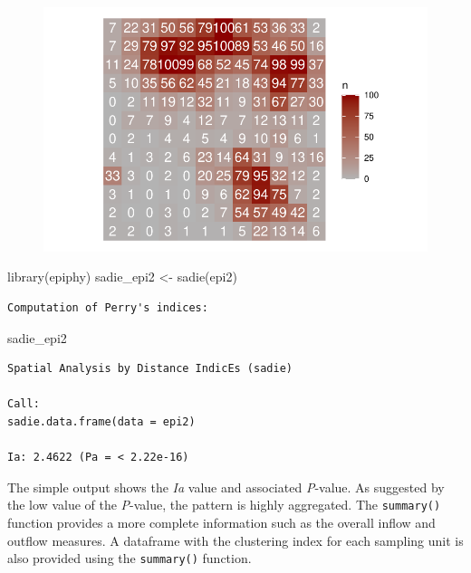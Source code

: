 \documentclass[
  letterpaper,
  DIV=11,
  numbers=noendperiod]{scrreprt}
\newenvironment{Shaded}{\begin{snugshade}}{\end{snugshade}}
\newcommand{\FunctionTok}[1]{\textcolor[rgb]{0.28,0.35,0.67}{#1}}
\newcommand{\NormalTok}[1]{\textcolor[rgb]{0.00,0.23,0.31}{#1}}
\newcommand{\OtherTok}[1]{\textcolor[rgb]{0.00,0.23,0.31}{#1}}
\begin{document}
\begin{figure}[H]

{\centering \includegraphics{./spatial-tests_files/figure-pdf/unnamed-chunk-76-1.pdf}

}

\end{figure}

\begin{Shaded}
\begin{Highlighting}[]
\FunctionTok{library}\NormalTok{(epiphy)}
\NormalTok{sadie\_epi2 }\OtherTok{\textless{}{-}} \FunctionTok{sadie}\NormalTok{(epi2)}
\end{Highlighting}
\end{Shaded}

\begin{verbatim}
Computation of Perry's indices:
\end{verbatim}

\begin{Shaded}
\begin{Highlighting}[]
\NormalTok{sadie\_epi2}
\end{Highlighting}
\end{Shaded}

\begin{verbatim}
Spatial Analysis by Distance IndicEs (sadie)

Call:
sadie.data.frame(data = epi2)

Ia: 2.4622 (Pa = < 2.22e-16)
\end{verbatim}

The simple output shows the \emph{Ia} value and associated
\emph{P}-value. As suggested by the low value of the \emph{P}-value, the
pattern is highly aggregated. The \texttt{summary()} function provides a
more complete information such as the overall inflow and outflow
measures. A dataframe with the clustering index for each sampling unit
is also provided using the \texttt{summary()} function.
\end{document}
